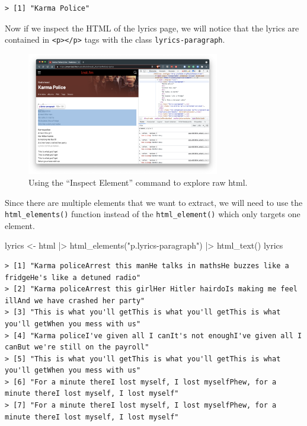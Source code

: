\documentclass[
  letterpaper,
]{latex/krantz}
\newenvironment{Shaded}{\begin{snugshade}}{\end{snugshade}}
\newcommand{\FunctionTok}[1]{\textcolor[rgb]{0.00,0.00,0.00}{#1}}
\newcommand{\NormalTok}[1]{\textcolor[rgb]{0.00,0.00,0.00}{#1}}
\newcommand{\OtherTok}[1]{\textcolor[rgb]{0.00,0.00,0.00}{#1}}
\newcommand{\SpecialCharTok}[1]{\textcolor[rgb]{0.00,0.00,0.00}{#1}}
\newcommand{\StringTok}[1]{\textcolor[rgb]{0.00,0.00,0.00}{#1}}
\begin{document}
\begin{verbatim}
> [1] "Karma Police"
\end{verbatim}

Now if we inspect the HTML of the lyrics page, we will notice that the
lyrics are contained in
\texttt{\textless{}p\textgreater{}\textless{}/p\textgreater{}} tags with
the class \texttt{lyrics-paragraph}.

\begin{figure}[h]

{\centering \includegraphics[width=0.75\textwidth,height=\textheight]{figures/acquire-data/ad-lastfm-lyrics-inspect.png}

}

\caption{\label{fig-ad-inspect-element-lyrics-lastfm}Using the ``Inspect
Element'' command to explore raw html.}

\end{figure}

Since there are multiple elements that we want to extract, we will need
to use the \texttt{html\_elements()} function instead of the
\texttt{html\_element()} which only targets one element.

\begin{Shaded}
\begin{Highlighting}[]
\NormalTok{lyrics }\OtherTok{\textless{}{-}} 
\NormalTok{  html }\SpecialCharTok{|\textgreater{}} 
  \FunctionTok{html\_elements}\NormalTok{(}\StringTok{"p.lyrics{-}paragraph"}\NormalTok{) }\SpecialCharTok{|\textgreater{}} 
  \FunctionTok{html\_text}\NormalTok{()}
\NormalTok{lyrics}
\end{Highlighting}
\end{Shaded}

\begin{verbatim}
> [1] "Karma policeArrest this manHe talks in mathsHe buzzes like a fridgeHe's like a detuned radio"      
> [2] "Karma policeArrest this girlHer Hitler hairdoIs making me feel illAnd we have crashed her party"   
> [3] "This is what you'll getThis is what you'll getThis is what you'll getWhen you mess with us"        
> [4] "Karma policeI've given all I canIt's not enoughI've given all I canBut we're still on the payroll" 
> [5] "This is what you'll getThis is what you'll getThis is what you'll getWhen you mess with us"        
> [6] "For a minute thereI lost myself, I lost myselfPhew, for a minute thereI lost myself, I lost myself"
> [7] "For a minute thereI lost myself, I lost myselfPhew, for a minute thereI lost myself, I lost myself"
\end{verbatim}
\end{document}
